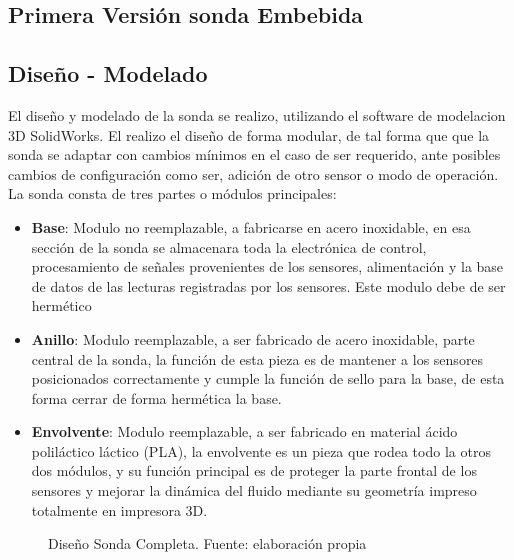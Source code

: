 \begin{appendices}
\subsection*{Primera Versi\'on sonda Embebida}

\subsection*{Diseño - Modelado}
El dise\~no y modelado de la sonda se realizo, utilizando el software de modelacion 3D SolidWorks.
El realizo el diseño de forma modular, de tal forma que que la sonda se adaptar con cambios mínimos en el caso de ser requerido, ante posibles cambios de configuración como ser, adición de otro sensor o modo de operación.    
La sonda consta de tres partes o módulos principales:

\begin{itemize}
\item \textbf{Base}: Modulo no reemplazable, a fabricarse en acero inoxidable, en esa sección de la sonda se almacenara toda la electrónica de control, procesamiento de señales provenientes de los sensores, alimentación y la base de datos de las lecturas registradas por los sensores. Este modulo debe de ser hermético 

\item \textbf{Anillo}: Modulo reemplazable, a ser fabricado de acero inoxidable, parte central de la sonda, la función de esta pieza es de mantener a los sensores posicionados correctamente y cumple la función de sello para la base, de esta forma cerrar de forma hermética la base.

\item \textbf{Envolvente}: Modulo reemplazable, a ser fabricado en material ácido poliláctico  láctico (PLA), la envolvente es un pieza que rodea todo la otros dos módulos, y su función principal es de proteger la parte frontal de los sensores y mejorar la dinámica del fluido mediante su geometría impreso totalmente en impresora 3D.  

\end{itemize}

\begin{figure}[ht]
\centering
{}
\caption{Dise\~no Sonda Completa. Fuente: elaboración propia}
\label{fig:SondaV5}
\end{figure}


\end{appendices}
